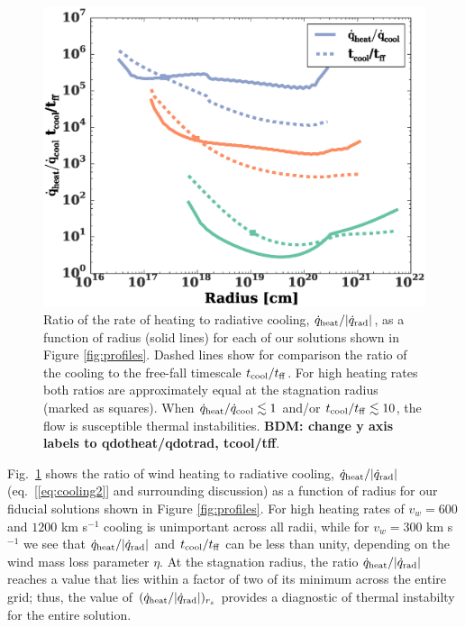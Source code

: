 \documentclass[usenatbib,fleqn]{mn2e}
\newcommand{\tcool}{t_{\rm cool}}
\newcommand{\tff}{t_{\rm ff}}
\begin{document}
\begin{figure}
  \includegraphics[width=\columnwidth]{cooling.eps}
  \caption{\label{fig:cooling} Ratio of the rate of heating to
radiative cooling, $\dot{q}_{\rm heat}/|\dot{q}_{\rm rad}|$, as a
function of radius (solid lines) for each of our solutions shown in
Figure \ref{fig:profiles}.  Dashed lines show for comparison the ratio
of the cooling to the free-fall timescale $t_{\rm cool}/t_{\rm ff}$.
For high heating rates both ratios are approximately equal at the
stagnation radius (marked as squares).  When $\dot{q}_{\rm
heat}/\dot{q}_{\rm cool} \lesssim 1$ and/or $t_{\rm cool}/t_{\rm ff}
\lesssim 10$, the flow is susceptible thermal instabilities.  {\bf
BDM: change y axis labels to qdotheat/qdotrad, tcool/tff}.}
\end{figure}


Fig.~\ref{fig:cooling} shows the ratio of wind heating to radiative cooling, $\dot{q}_{\rm heat}/|\dot{q}_{\rm rad}|$ (eq.~[\ref{eq:cooling2}] and surrounding discussion) as a function of radius for our fiducial solutions shown in Figure \ref{fig:profiles}.  For high heating rates of $v_{w} = 600$ and $1200$ km s$^{-1}$ cooling is unimportant across all radii, while for $v_{w} = 300$ km s$^{-1}$ we see that $\dot{q}_{\rm heat}/|\dot{q}_{\rm rad}|$ and $\tcool/\tff$ can be less than unity, depending on the wind mass loss parameter $\eta$.  At the stagnation radius, the ratio $\dot{q}_{\rm heat}/|\dot{q}_{\rm rad}|$ reaches a value that lies within a factor of two of its minimum across the entire grid;  thus, the value of $(\dot{q}_{\rm heat}/|\dot{q}_{\rm rad}|)_{r_{s}}$ provides a diagnostic of thermal instabilty for the entire solution.  
\end{document}
